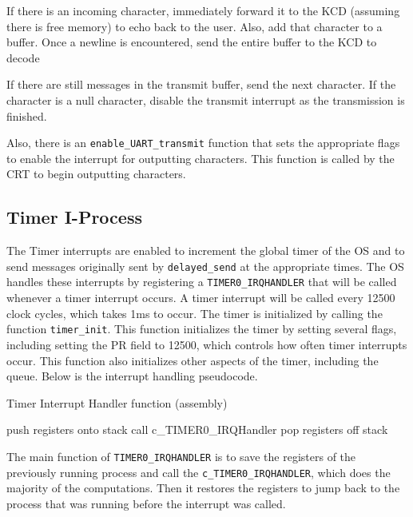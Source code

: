 \documentclass[12pt]{report}
\begin{document}
If there is an incoming character, immediately forward it to the KCD (assuming there is free memory) to echo back to the user. Also, add that character to a buffer. Once a newline is encountered, send the entire buffer to the KCD to decode

If there are still messages in the transmit buffer, send the next character. If the character is a null character, disable the transmit interrupt as the transmission is finished.


Also, there is an \texttt{enable_UART_transmit} function that sets the appropriate flags to enable the interrupt for outputting characters. This function is called by the CRT to begin outputting characters.


\subsection{Timer I-Process}

The Timer interrupts are enabled to increment the global timer of the OS and to send messages originally sent by \texttt{delayed_send} at the appropriate times.  The OS handles these interrupts by registering a \texttt{TIMER0_IRQHANDLER} that will be called whenever a timer interrupt occurs.  A timer interrupt will be called every 12500 clock cycles, which takes 1ms to occur.
The timer is initialized by calling the function \texttt{timer\_init}.  This function initializes the timer by setting several flags, including setting the PR field to 12500, which controls how often timer interrupts occur.  This function also initializes other aspects of the timer, including the queue.  Below is the interrupt handling pseudocode.

\begin{algorithm}[H]
	\caption{Timer Interrupt Handler function (assembly)}
	\begin{algorithmic}[1]
	    \State push registers onto stack
	    \State call c_TIMER0\_IRQHandler
	    \State pop registers off stack
	  \EndFunction
	\end{algorithmic}
\end{algorithm}

The main function of \texttt{TIMER0_IRQHANDLER} is to save the registers of the previously running process and call the \texttt{c_TIMER0_IRQHANDLER}, which does the majority of the computations.  Then it restores the registers to jump back to the process that was running before the interrupt was called.
\end{document}
